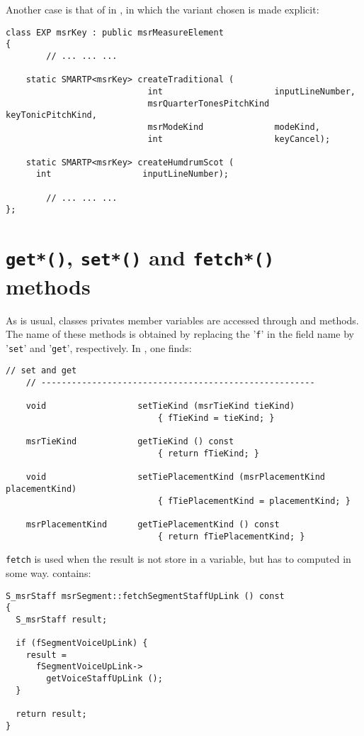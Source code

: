 Another case is that of  in , in which the variant chosen is made explicit:
\begin{lstlisting}[language=CPlusPlus]
class EXP msrKey : public msrMeasureElement
{
		// ... ... ...

    static SMARTP<msrKey> createTraditional (
                            int                      inputLineNumber,
                            msrQuarterTonesPitchKind keyTonicPitchKind,
                            msrModeKind              modeKind,
                            int                      keyCancel);

    static SMARTP<msrKey> createHumdrumScot (
      int                  inputLineNumber);

		// ... ... ...
};
\end{lstlisting}


\section{{\tt get*()}, {\tt set*()} and {\tt fetch*()} methods}

As is usual, classes privates member variables are accessed through  and  methods. The name of these methods is obtained by replacing the '{\tt f}' in the field name by '{\tt set}' and '{\tt get}', respectively. In , one finds:
\begin{lstlisting}[language=CPlusPlus]
    // set and get
    // ------------------------------------------------------

    void                  setTieKind (msrTieKind tieKind)
                              { fTieKind = tieKind; }

    msrTieKind            getTieKind () const
                              { return fTieKind; }

    void                  setTiePlacementKind (msrPlacementKind placementKind)
                              { fTiePlacementKind = placementKind; }

    msrPlacementKind      getTiePlacementKind () const
                              { return fTiePlacementKind; }
\end{lstlisting}


{\tt fetch} is used when the result is not store in a variable, but has to computed in some way.  contains:
\begin{lstlisting}[language=CPlusPlus]
S_msrStaff msrSegment::fetchSegmentStaffUpLink () const
{
  S_msrStaff result;

  if (fSegmentVoiceUpLink) {
    result =
      fSegmentVoiceUpLink->
        getVoiceStaffUpLink ();
  }

  return result;
}
\end{lstlisting}


